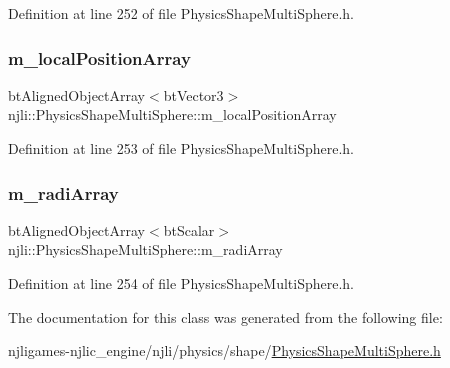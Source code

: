 Definition at line 252 of file Physics\+Shape\+Multi\+Sphere.\+h.

\mbox{\label{classnjli_1_1_physics_shape_multi_sphere_a20192615e273ac465050fb139edcae76}} 
\subsubsection{\texorpdfstring{m\+\_\+local\+Position\+Array}{m\_localPositionArray}}
{\footnotesize\ttfamily bt\+Aligned\+Object\+Array$<$bt\+Vector3$>$ njli\+::\+Physics\+Shape\+Multi\+Sphere\+::m\+\_\+local\+Position\+Array\hspace{0.3cm}{\ttfamily [private]}}



Definition at line 253 of file Physics\+Shape\+Multi\+Sphere.\+h.

\mbox{\label{classnjli_1_1_physics_shape_multi_sphere_a9a7781979e6a9f6b62e5c621b14ccc6c}} 
\subsubsection{\texorpdfstring{m\+\_\+radi\+Array}{m\_radiArray}}
{\footnotesize\ttfamily bt\+Aligned\+Object\+Array$<$bt\+Scalar$>$ njli\+::\+Physics\+Shape\+Multi\+Sphere\+::m\+\_\+radi\+Array\hspace{0.3cm}{\ttfamily [private]}}



Definition at line 254 of file Physics\+Shape\+Multi\+Sphere.\+h.



The documentation for this class was generated from the following file\+:\begin{DoxyCompactItemize}
\item 
njligames-\/njlic\+\_\+engine/njli/physics/shape/\mbox{\hyperlink{_physics_shape_multi_sphere_8h}{Physics\+Shape\+Multi\+Sphere.\+h}}\end{DoxyCompactItemize}

